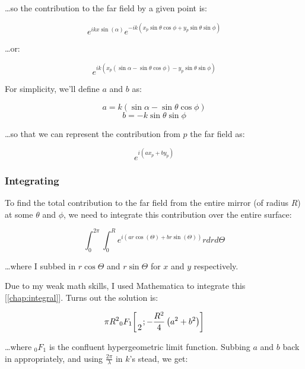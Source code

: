 \documentclass[etd,oneside,senior]{BYUPhys}
\newcommand*\pFqskip{8mu}
\newcommand*\pFq{\begingroup
        \catcode`\,\active
        \def ,{\mskip\pFqskip\relax}%
        \dopFq
}
\def\dopFq#1#2#3#4#5{%
        {}_{#1}F_{#2}\biggl[\genfrac..{0pt}{}{#3}{#4};#5\biggr]%
        \endgroup
}
\begin{document}
\ldots so the contribution to the far field by a given point is:

\begin{equation}
  e^{ikx\sin\left({\alpha}\right)}e^{-ik(x_p\sin{\theta}\cos{\phi}+y_p\sin{\theta}\sin{\phi})}
\end{equation}

\ldots or:

\begin{equation}
  e^{ik\left(x_p(\sin{\alpha}-\sin{\theta}\cos{\phi})-y_p\sin{\theta}\sin{\phi}\right)}
\end{equation}

For simplicity, we'll define $a$ and $b$ as:

\begin{equation}
  a = k\left(\sin{\alpha}-\sin{\theta}\cos{\phi}\right)
\end{equation}
\begin{equation}
  b = -k\sin{\theta}\sin{\phi}
\end{equation}

\ldots so that we can represent the contribution from $p$ the far field as:

\begin{equation}
  e^{i(ax_p+by_p)}
\end{equation}

\subsubsection{Integrating}
To find the total contribution to the far field from the entire mirror (of radius $R$) at some $\theta$ and $\phi$, we need to integrate this contribution over the entire surface:

\begin{equation}\label{eq:integral1}
  \int_0^{2\pi}\int_0^R e^{i(ar\cos(\Theta)+br\sin(\Theta))} rdrd\Theta
\end{equation}

\ldots where I subbed in $r\cos\Theta$ and $r\sin\Theta$ for $x$ and $y$ respectively.

Due to my weak math skills, I used Mathematica to integrate this [\ref{chap:integral}]. Turns out the solution is:

\begin{equation}\label{eq:expected_refl}
  \pi R^2 \pFq{0}{1}{}{2}{-\frac{R^2}{4}\left(a^2+b^2\right)}
\end{equation}

\ldots where ${}_0 F_1$ is the confluent hypergeometric limit function. Subbing $a$ and $b$ back in appropriately, and using $\frac{2\pi}{\lambda}$ in $k$'s stead, we get:
\end{document}
